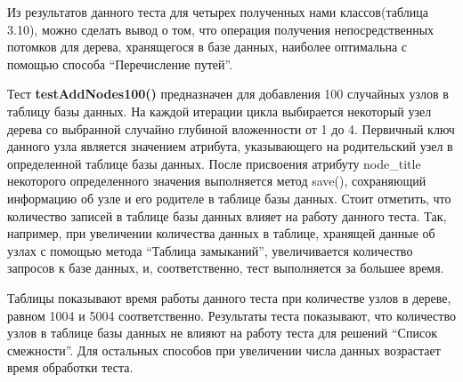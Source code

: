 \documentclass[a4paper,14pt]{extreport}
\theoremstyle{definition}
\begin{document}
\begin{enumerate}
Из результатов данного теста для четырех полученных нами классов(таблица 3.10), можно сделать вывод о том, что операция получения непосредственных потомков для дерева, хранящегося в базе данных, наиболее оптимальна с помощью способа “Перечисление путей”.
\begin{table}[H]
\end{table}
Тест \textbf{testAddNodes100()} предназначен для добавления 100 случайных узлов в таблицу базы данных. На каждой итерации цикла выбирается некоторый узел дерева со выбранной случайно глубиной вложенности от 1 до 4. Первичный ключ данного узла является значением атрибута, указывающего на родительский узел в определенной таблице базы данных. После присвоения атрибуту node\_title некоторого определенного значения выполняется метод save(), сохраняющий информацию об узле и его родителе в таблице базы данных.
Стоит отметить, что количество записей в таблице базы данных влияет на работу данного теста. Так, например, при увеличении количества данных в таблице, хранящей данные об узлах с помощью метода “Таблица замыканий”, увеличивается количество запросов к базе данных, и, соответственно, тест выполняется за большее время.

Таблицы показывают время работы данного теста при количестве узлов в дереве, равном 1004 и 5004 соответственно. Результаты теста показывают, что количество узлов в таблице базы данных не влияют на работу теста для решений “Список смежности”. Для остальных способов при увеличении числа данных возрастает время обработки теста.

\begin{table}[H]
\end{table}


\end{enumerate}
\end{document}
